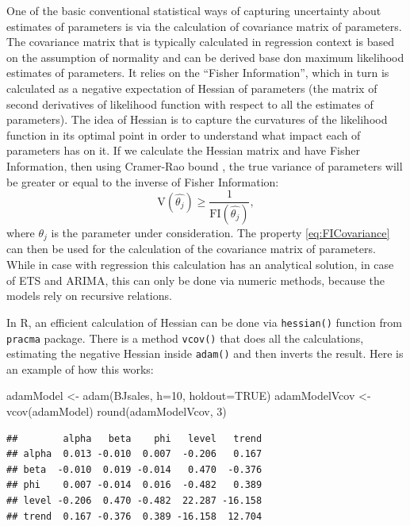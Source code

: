 \documentclass[
]{book}
\newenvironment{Shaded}{\begin{snugshade}}{\end{snugshade}}
\newcommand{\AttributeTok}[1]{\textcolor[rgb]{0.77,0.63,0.00}{#1}}
\newcommand{\ConstantTok}[1]{\textcolor[rgb]{0.00,0.00,0.00}{#1}}
\newcommand{\DecValTok}[1]{\textcolor[rgb]{0.00,0.00,0.81}{#1}}
\newcommand{\FunctionTok}[1]{\textcolor[rgb]{0.00,0.00,0.00}{#1}}
\newcommand{\NormalTok}[1]{#1}
\newcommand{\OtherTok}[1]{\textcolor[rgb]{0.56,0.35,0.01}{#1}}
\theoremstyle{definition}
\theoremstyle{definition}
\theoremstyle{definition}
\theoremstyle{definition}
\theoremstyle{remark}
\begin{document}
One of the basic conventional statistical ways of capturing uncertainty about estimates of parameters is via the calculation of covariance matrix of parameters. The covariance matrix that is typically calculated in regression context is based on the assumption of normality and can be derived base don maximum likelihood estimates of parameters. It relies on the ``Fisher Information'', which in turn is calculated as a negative expectation of Hessian of parameters (the matrix of second derivatives of likelihood function with respect to all the estimates of parameters). The idea of Hessian is to capture the curvatures of the likelihood function in its optimal point in order to understand what impact each of parameters has on it. If we calculate the Hessian matrix and have Fisher Information, then using Cramer-Rao bound \citep{WikipediaCramerRaoBound}, the true variance of parameters will be greater or equal to the inverse of Fisher Information:
\begin{equation}
    \mathrm{V}(\hat{\theta_j}) \geq \frac{1}{\mathrm{FI}(\hat{\theta_j})} ,
    \label{eq:FICovariance}
\end{equation}
where \(\theta_j\) is the parameter under consideration. The property \eqref{eq:FICovariance} can then be used for the calculation of the covariance matrix of parameters. While in case with regression this calculation has an analytical solution, in case of ETS and ARIMA, this can only be done via numeric methods, because the models rely on recursive relations.

In R, an efficient calculation of Hessian can be done via \texttt{hessian()} function from \texttt{pracma} package. There is a method \texttt{vcov()} that does all the calculations, estimating the negative Hessian inside \texttt{adam()} and then inverts the result. Here is an example of how this works:

\begin{Shaded}
\begin{Highlighting}[]
\NormalTok{adamModel }\OtherTok{\textless{}{-}} \FunctionTok{adam}\NormalTok{(BJsales, }\AttributeTok{h=}\DecValTok{10}\NormalTok{, }\AttributeTok{holdout=}\ConstantTok{TRUE}\NormalTok{)}
\NormalTok{adamModelVcov }\OtherTok{\textless{}{-}} \FunctionTok{vcov}\NormalTok{(adamModel)}
\FunctionTok{round}\NormalTok{(adamModelVcov, }\DecValTok{3}\NormalTok{)}
\end{Highlighting}
\end{Shaded}

\begin{verbatim}
##        alpha   beta    phi   level   trend
## alpha  0.013 -0.010  0.007  -0.206   0.167
## beta  -0.010  0.019 -0.014   0.470  -0.376
## phi    0.007 -0.014  0.016  -0.482   0.389
## level -0.206  0.470 -0.482  22.287 -16.158
## trend  0.167 -0.376  0.389 -16.158  12.704
\end{verbatim}
\end{document}
